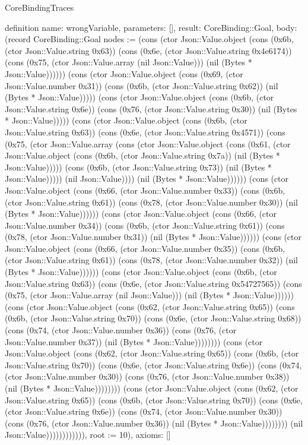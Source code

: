 \begin{lexlean}{CoreBindingTraces}
\begin{semanticmodule}
definition{
 name: wrongVariable,
 parameters: [],
 result: CoreBinding::Goal,
 body: (record CoreBinding::Goal {nodes := (cons (ctor Json::Value.object (cons (0x6b, (ctor Json::Value.string 0x63)) (cons (0x6e, (ctor Json::Value.string 0x4e6174)) (cons (0x75, (ctor Json::Value.array (nil Json::Value))) (nil (Bytes * Json::Value)))))) (cons (ctor Json::Value.object (cons (0x69, (ctor Json::Value.number 0x31)) (cons (0x6b, (ctor Json::Value.string 0x62)) (nil (Bytes * Json::Value))))) (cons (ctor Json::Value.object (cons (0x6b, (ctor Json::Value.string 0x6e)) (cons (0x76, (ctor Json::Value.string 0x30)) (nil (Bytes * Json::Value))))) (cons (ctor Json::Value.object (cons (0x6b, (ctor Json::Value.string 0x63)) (cons (0x6e, (ctor Json::Value.string 0x4571)) (cons (0x75, (ctor Json::Value.array (cons (ctor Json::Value.object (cons (0x61, (ctor Json::Value.object (cons (0x6b, (ctor Json::Value.string 0x7a)) (nil (Bytes * Json::Value))))) (cons (0x6b, (ctor Json::Value.string 0x73)) (nil (Bytes * Json::Value))))) (nil Json::Value)))) (nil (Bytes * Json::Value)))))) (cons (ctor Json::Value.object (cons (0x66, (ctor Json::Value.number 0x33)) (cons (0x6b, (ctor Json::Value.string 0x61)) (cons (0x78, (ctor Json::Value.number 0x30)) (nil (Bytes * Json::Value)))))) (cons (ctor Json::Value.object (cons (0x66, (ctor Json::Value.number 0x34)) (cons (0x6b, (ctor Json::Value.string 0x61)) (cons (0x78, (ctor Json::Value.number 0x31)) (nil (Bytes * Json::Value)))))) (cons (ctor Json::Value.object (cons (0x66, (ctor Json::Value.number 0x35)) (cons (0x6b, (ctor Json::Value.string 0x61)) (cons (0x78, (ctor Json::Value.number 0x32)) (nil (Bytes * Json::Value)))))) (cons (ctor Json::Value.object (cons (0x6b, (ctor Json::Value.string 0x63)) (cons (0x6e, (ctor Json::Value.string 0x54727565)) (cons (0x75, (ctor Json::Value.array (nil Json::Value))) (nil (Bytes * Json::Value)))))) (cons (ctor Json::Value.object (cons (0x62, (ctor Json::Value.string 0x65)) (cons (0x6b, (ctor Json::Value.string 0x70)) (cons (0x6e, (ctor Json::Value.string 0x68)) (cons (0x74, (ctor Json::Value.number 0x36)) (cons (0x76, (ctor Json::Value.number 0x37)) (nil (Bytes * Json::Value)))))))) (cons (ctor Json::Value.object (cons (0x62, (ctor Json::Value.string 0x65)) (cons (0x6b, (ctor Json::Value.string 0x70)) (cons (0x6e, (ctor Json::Value.string 0x6e)) (cons (0x74, (ctor Json::Value.number 0x30)) (cons (0x76, (ctor Json::Value.number 0x38)) (nil (Bytes * Json::Value)))))))) (cons (ctor Json::Value.object (cons (0x62, (ctor Json::Value.string 0x65)) (cons (0x6b, (ctor Json::Value.string 0x70)) (cons (0x6e, (ctor Json::Value.string 0x6e)) (cons (0x74, (ctor Json::Value.number 0x30)) (cons (0x76, (ctor Json::Value.number 0x36)) (nil (Bytes * Json::Value)))))))) (nil Json::Value)))))))))))), root := 10}),
 axioms: []
}


\end{semanticmodule}
\end{lexlean}
